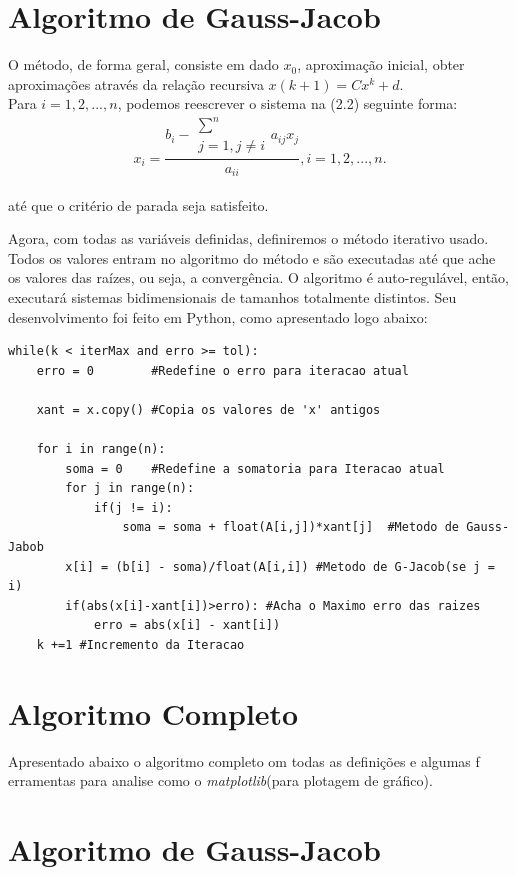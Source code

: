 \documentclass[
12pt,				%
openright,			%
twoside,			%
a4paper,			%
english,			%
french,				%
spanish,			%
brazil				%
]{abntex2_new}
\begin{document}
		
		\section{Algoritmo de Gauss-Jacob}
		O método, de forma geral, consiste em dado $x_0$, aproximação inicial, 
		obter aproximações através da relação recursiva $x{(k+1)}=Cx^k + d$.\\
		Para $i = 1,2,...,n$, podemos reescrever o sistema na (2.2) seguinte forma:\\
		$$x_i = \frac{b_i - \substack{\sum^{n} \\j=1,j \neq i}a_{ij}x_j}{a_{ii}}, i =
		1,2,...,n.$$\\
		até que o critério de parada seja satisfeito.
		

		
				Agora, com todas as variáveis definidas, definiremos o método iterativo usado.
				Todos os
				valores entram no algoritmo do método e são executadas até que ache os valores
				das raízes, ou seja, a convergência.
				O algoritmo é auto-regulável, então, executará sistemas bidimensionais de
				tamanhos totalmente distintos.
				Seu desenvolvimento foi feito em Python, como apresentado logo abaixo:\\
				\begin{lstlisting}
while(k < iterMax and erro >= tol):
	erro = 0		#Redefine o erro para iteracao atual
	
	xant = x.copy() #Copia os valores de 'x' antigos
	
	for i in range(n):
		soma = 0	#Redefine a somatoria para Iteracao atual
		for j in range(n):
			if(j != i):
				soma = soma + float(A[i,j])*xant[j]  #Metodo de Gauss-Jabob
		x[i] = (b[i] - soma)/float(A[i,i]) #Metodo de G-Jacob(se j = i)
		if(abs(x[i]-xant[i])>erro):	#Acha o Maximo erro das raizes
			erro = abs(x[i] - xant[i])
	k +=1 #Incremento da Iteracao\end{lstlisting}
				
		
	
		
		\section{Algoritmo Completo}
		Apresentado abaixo o algoritmo completo om todas as definições e algumas f
		erramentas para analise como o \textit{matplotlib}(para plotagem de gráfico).
		
		
		
		
		
		\section{Algoritmo de Gauss-Jacob}
		
\end{document}
